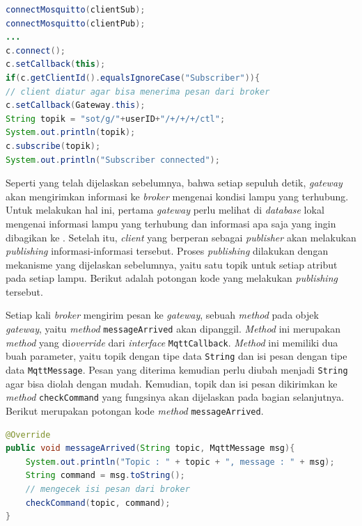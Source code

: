  \begin{lstlisting}[language=Java,label=code:timer,caption=Menghubungkan \textit{client} dengan \textit{broker}]
connectMosquitto(clientSub);
connectMosquitto(clientPub);
...
c.connect();
c.setCallback(this);
if(c.getClientId().equalsIgnoreCase("Subscriber")){
// client diatur agar bisa menerima pesan dari broker
c.setCallback(Gateway.this);
String topik = "sot/g/"+userID+"/+/+/+/ctl";
System.out.println(topik);
c.subscribe(topik);
System.out.println("Subscriber connected");
 \end{lstlisting}

Seperti yang telah dijelaskan sebelumnya, bahwa setiap sepuluh detik, \textit{gateway} akan mengirimkan informasi ke \textit{broker} mengenai kondisi lampu yang terhubung. Untuk melakukan hal ini, pertama \textit{gateway} perlu melihat di \textit{database} lokal mengenai informasi lampu yang terhubung dan informasi apa saja yang ingin dibagikan ke \plat. Setelah itu, \textit{client} yang berperan sebagai \textit{publisher} akan melakukan \textit{publishing} informasi-informasi tersebut. Proses \textit{publishing} dilakukan dengan mekanisme yang dijelaskan sebelumnya, yaitu satu topik untuk setiap atribut pada setiap lampu. Berikut adalah potongan kode yang melakukan \textit{publishing} tersebut.



Setiap kali \textit{broker} mengirim pesan ke \textit{gateway}, sebuah \textit{method} pada objek \textit{gateway}, yaitu \textit{method} \texttt{messageArrived} akan dipanggil. \textit{Method} ini merupakan \textit{method} yang di\textit{override} dari \textit{interface} \texttt{MqttCallback}. \textit{Method} ini memiliki dua buah parameter, yaitu topik dengan tipe data \texttt{String} dan isi pesan dengan tipe data \texttt{MqttMessage}. Pesan yang diterima kemudian perlu diubah menjadi \texttt{String} agar bisa diolah dengan mudah. Kemudian, topik dan isi pesan dikirimkan ke \textit{method} \texttt{checkCommand} yang fungsinya akan dijelaskan pada bagian selanjutnya. Berikut merupakan potongan kode \textit{method} \texttt{messageArrived}.

\begin{lstlisting}[language=Java,label=code:timer,caption=\textit{Method} messageArrived]
@Override
public void messageArrived(String topic, MqttMessage msg){
	System.out.println("Topic : " + topic + ", message : " + msg);
	String command = msg.toString();
	// mengecek isi pesan dari broker
	checkCommand(topic, command);
}
\end{lstlisting}

